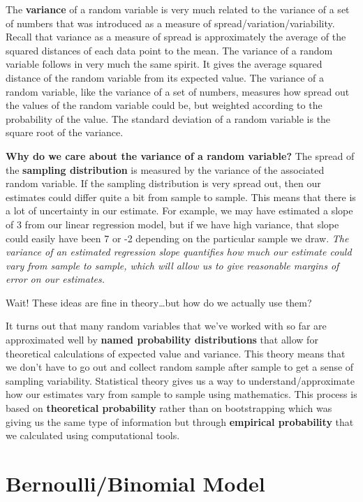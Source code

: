 \documentclass[
]{book}
\begin{document}
The \textbf{variance} of a random variable is very much related to the variance of a set of numbers that was introduced as a measure of spread/variation/variability. Recall that variance as a measure of spread is approximately the average of the squared distances of each data point to the mean. The variance of a random variable follows in very much the same spirit. It gives the average squared distance of the random variable from its expected value. The variance of a random variable, like the variance of a set of numbers, measures how spread out the values of the random variable could be, but weighted according to the probability of the value. The standard deviation of a random variable is the square root of the variance.

\textbf{Why do we care about the variance of a random variable?} The spread of the \textbf{sampling distribution} is measured by the variance of the associated random variable. If the sampling distribution is very spread out, then our estimates could differ quite a bit from sample to sample. This means that there is a lot of uncertainty in our estimate. For example, we may have estimated a slope of 3 from our linear regression model, but if we have high variance, that slope could easily have been 7 or -2 depending on the particular sample we draw. \emph{The variance of an estimated regression slope quantifies how much our estimate could vary from sample to sample, which will allow us to give reasonable margins of error on our estimates.}

Wait! These ideas are fine in theory\ldots but how do we actually use them?

It turns out that many random variables that we've worked with so far are approximated well by \textbf{named probability distributions} that allow for theoretical calculations of expected value and variance. This theory means that we don't have to go out and collect random sample after sample to get a sense of sampling variability. Statistical theory gives us a way to understand/approximate how our estimates vary from sample to sample using mathematics. This process is based on \textbf{theoretical probability} rather than on bootstrapping which was giving us the same type of information but through \textbf{empirical probability} that we calculated using computational tools.

\section{Bernoulli/Binomial Model}\label{bernoullibinomial-model}
\end{document}
